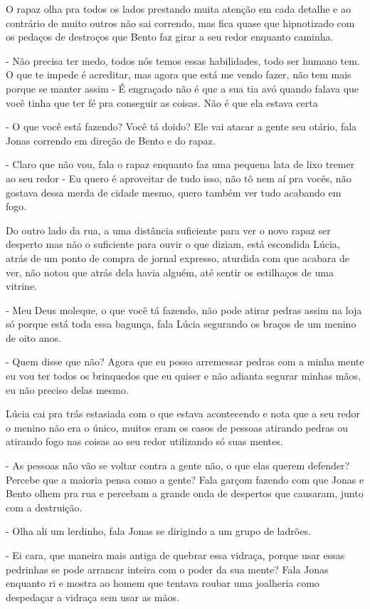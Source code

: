 O rapaz olha pra todos os lados prestando muita atenção em cada detalhe e ao contrário de muito outros não sai correndo, mas fica quase que hipnotizado com os pedaços de destroços que Bento faz girar a seu redor enquanto caminha.

- Não precisa ter medo, todos nós temos essas habilidades, todo ser humano tem. O que te impede é acreditar, mas agora que está me vendo fazer, não tem mais porque se manter assim - É engraçado não é que a sua tia avó quando falava que você tinha que ter fé pra conseguir as coisas. Não é que ela estava certa

- O que você está fazendo? Você tá doido? Ele vai atacar a gente seu otário, fala Jonas correndo em direção de Bento e do rapaz.

- Claro que não vou, fala o rapaz enquanto faz uma pequena lata de lixo tremer ao seu redor - Eu quero é aproveitar de tudo isso, não tô nem aí pra vocês, não gostava dessa merda de cidade mesmo, quero também ver tudo acabando em fogo.

Do outro lado da rua, a uma distância suficiente para ver o novo rapaz ser desperto mas não o suficiente para ouvir o que diziam, está escondida Lúcia, atrás de um ponto de compra de jornal expresso, aturdida com que acabara de ver, não notou que atrás dela havia alguém, até sentir os estilhaços de uma vitrine.

- Meu Deus moleque, o que você tá fazendo, não pode atirar pedras assim na loja só porque está toda essa bagunça, fala Lúcia segurando os braços de um menino de oito anos.

- Quem disse que não? Agora que eu posso arremessar pedras com a minha mente eu vou ter todos os brinquedos que eu quiser e não adianta segurar minhas mãos, eu não preciso delas mesmo.

Lúcia cai pra trás estasiada com o que estava acontecendo e nota que a seu redor o menino não era o único, muitos eram os casos de pessoas atirando pedras ou atirando fogo nas coisas ao seu redor utilizando só suas mentes.

- As pessoas não vão se voltar contra a gente não, o que elas querem defender? Percebe que a maioria pensa como a gente? Fala garçom fazendo com que Jonas e Bento olhem pra rua e percebam a grande onda de despertos que causaram, junto com a destruição.

- Olha ali um lerdinho, fala Jonas se dirigindo a um grupo de ladrões.

- Ei cara, que maneira mais antiga de quebrar essa vidraça, porque usar essas pedrinhas se pode arrancar inteira com o poder da sua mente? Fala Jonas enquanto ri e mostra ao homem que tentava roubar uma joalheria como despedaçar a vidraça sem usar as mãos.

